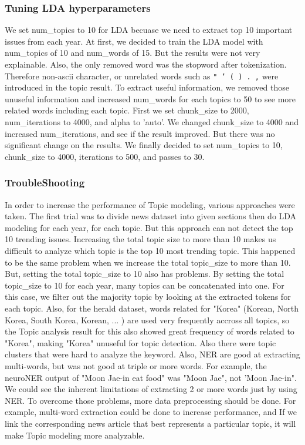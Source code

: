 \subsubsection{Tuning LDA hyperparameters}
We set num\_topics to 10 for LDA becuase we need to extract top 10 important issues from each year. At first, we decided to train the LDA model with num\_topics of 10 and num\_words of 15. But the results were not very explainable. Also, the only removed word was the stopword after tokenization. Therefore non-ascii character, or unrelated words such as
\texttt{" \xec ' ( ) . ,} were introduced in the topic result. To extract useful information, we removed those unuseful information and increased num\_words for each topics to 50 to see more related words including each topic. First we set chunk\_size to 2000, num\_iterations to 4000, and alpha to 'auto'. We changed chunk\_size to 4000 and increased num\_iterations, and see if the result improved. But there was no significant change on the results. We finally decided to set num\_topics to 10, chunk\_size to 4000, iterations to 500, and passes to 30.

\subsubsection{TroubleShooting}
In order to increase the performance of Topic modeling, various approaches were taken. The first trial was to divide news dataset into given sections then do LDA modeling for each year, for each topic. But this approach can not detect the top 10 trending issues. Increasing the total topic size to more than 10 makes us difficult to analyze which topic is the top 10 most trending topic. This happened to be the same problem when we increase the total topic\_size to more than 10.
But, setting the total topic\_size to 10 also has problems. By setting the total topic\_size to 10 for each year, many topics can be concatenated into one. For this case, we filter out the majority topic by looking at the extracted tokens for each topic. Also, for the herald dataset, words related for "Korea" (Korean, North Korea, South Korea, Korean, ... ) are used very frequently accross all topics, so the Topic analysis result for this also showed great frequency of words related to "Korea", making "Korea" unuseful for topic detection. Also there were topic clusters that were hard to analyze the keyword. Also, NER are good at extracting multi-words, but was not good at triple or more words. For example, the neuroNER output of "Moon Jae-in eat food" was "Moon Jae", not 'Moon Jae-in". We could see the inherent limitations of extracting 2 or more words just by using NER. To overcome those problems, more data preprocessing should be done. For example, multi-word extraction could be done to increase performance, and If we link the corresponding news article that best represents a particular topic, it will make Topic modeling more analyzable.

